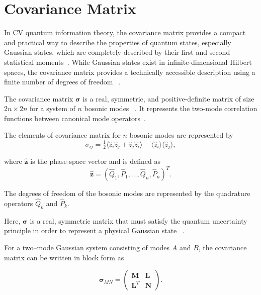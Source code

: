 \section{Covariance Matrix}

In CV quantum information theory, the covariance matrix provides a compact and practical way to describe the properties of quantum states, especially Gaussian states, which are completely described by their first and second statistical
moments~\cite{AdessoSerafiniIlluminati2004}. While Gaussian states exist in
infinite-dimensional Hilbert spaces, the covariance matrix provides a technically
accessible description using a finite number of degrees of freedom%
~\cite{AdessoRagyLee2014,Weedbrook2012}.

The covariance matrix $\boldsymbol{\sigma}$ is a real, symmetric, and positive-definite
matrix of size $2n \times 2n$ for a system of $n$ bosonic modes%
~\cite{AdessoRagyLee2014,Weedbrook2012}. It represents the two-mode correlation
functions between canonical mode operators~\cite{AdessoRagyLee2014}.

The elements of covariance matrix for $n$ bosonic modes are represented by
\begin{equation}
	\sigma_{ij} =
	\tfrac{1}{2}
	\langle \hat{z}_{i}\hat{z}_{j} + \hat{z}_{j}\hat{z}_{i} \rangle
	-
	\langle \hat{z}_{i} \rangle \langle \hat{z}_{j} \rangle,
\end{equation}

where $\hat{\mathbf{z}}$ is the phase-space vector and is defined as
\begin{equation}
	\hat{\mathbf{z}} =
	(\hat{Q}_{1}, \hat{P}_{1}, \ldots, \hat{Q}_{n}, \hat{P}_{n})^{T}.
\end{equation}

The degrees of freedom of the bosonic modes are represented by the quadrature operators
$\hat{Q}_{k}$ and $\hat{P}_{k}$.

Here, $\boldsymbol{\sigma}$ is a real, symmetric matrix that must satisfy the quantum
uncertainty principle in order to represent a physical Gaussian state
~\cite{AdessoSerafiniIlluminati2004}.

For a two--mode Gaussian system consisting of modes $A$ and $B$, the covariance matrix
can be written in block form as~\cite{AdessoRagyLee2014,Weedbrook2012}

\begin{equation}
	\boldsymbol{\sigma}_{MN} =
	\begin{pmatrix}
		\mathbf{M} & \mathbf{L} \\
		\mathbf{L}^{T} & \mathbf{N}
	\end{pmatrix}.
\end{equation}


